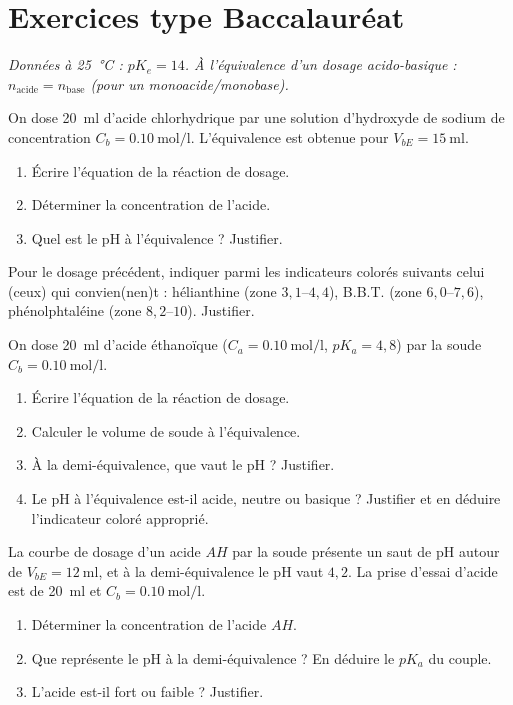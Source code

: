 \section{Exercices type Baccalauréat}
\textit{Données à \SI{25}{\celsius} : $pK_e = 14$. À l'équivalence d'un dosage
acido-basique : $n_{\text{acide}} = n_{\text{base}}$ (pour un monoacide/monobase).}


\exo{} On dose \SI{20}{\milli\litre} d'acide chlorhydrique par une solution
d'hydroxyde de sodium de concentration $C_b = \SI{0.10}{\mol\per\litre}$. L'équivalence
est obtenue pour $V_{bE} = \SI{15}{\milli\litre}$.
\begin{enumerate}[label=\arabic*)]
\item Écrire l'équation de la réaction de dosage.
\item Déterminer la concentration de l'acide.
\item Quel est le pH à l'équivalence ? Justifier.
\end{enumerate}

\exo{} Pour le dosage précédent, indiquer parmi les indicateurs colorés
suivants celui (ceux) qui convien(nen)t : hélianthine (zone $3{,}1$–$4{,}4$),
B.B.T. (zone $6{,}0$–$7{,}6$), phénolphtaléine (zone $8{,}2$–$10$). Justifier.


\exo{} On dose \SI{20}{\milli\litre} d'acide éthanoïque
($C_a = \SI{0.10}{\mol\per\litre}$, $pK_a = 4{,}8$) par la soude
$C_b = \SI{0.10}{\mol\per\litre}$.
\begin{enumerate}[label=\arabic*)]
\item Écrire l'équation de la réaction de dosage.
\item Calculer le volume de soude à l'équivalence.
\item À la demi-équivalence, que vaut le pH ? Justifier.
\item Le pH à l'équivalence est-il acide, neutre ou basique ? Justifier et en déduire
l'indicateur coloré approprié.
\end{enumerate}

\exo{} La courbe de dosage d'un acide $AH$ par la soude présente un saut de
pH autour de $V_{bE} = \SI{12}{\milli\litre}$, et à la demi-équivalence le pH vaut
$4{,}2$. La prise d'essai d'acide est de \SI{20}{\milli\litre} et
$C_b = \SI{0.10}{\mol\per\litre}$.
\begin{enumerate}[label=\arabic*)]
\item Déterminer la concentration de l'acide $AH$.
\item Que représente le pH à la demi-équivalence ? En déduire le $pK_a$ du couple.
\item L'acide est-il fort ou faible ? Justifier.
\end{enumerate}

